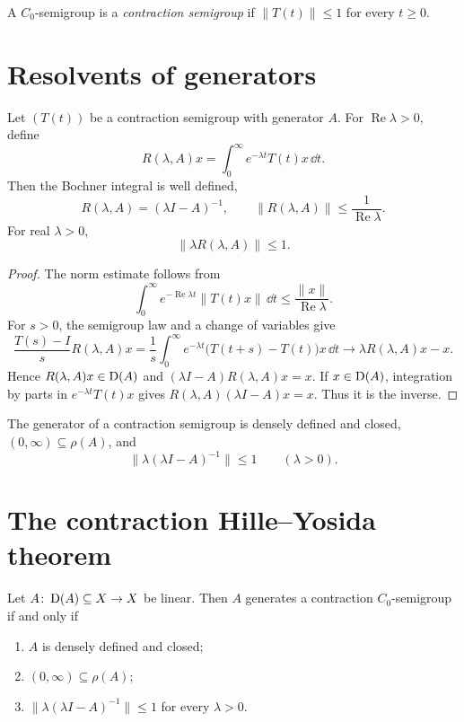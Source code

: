 \begin{notedefinition}
A $C_0$-semigroup is a \emph{contraction semigroup} if
$\|T(t)\|\le1$ for every $t\ge0$.
\end{notedefinition}

\section{Resolvents of generators}

\begin{notelemma}
Let $(T(t))$ be a contraction semigroup with generator $A$.  For
$\operatorname{Re}\lambda>0$, define
\[
  R(\lambda,A)x
  =\int_0^\infty e^{-\lambda t}T(t)x\,\dd t.
\]
Then the Bochner integral is well defined,
\[
  R(\lambda,A)=(\lambda I-A)^{-1},
  \qquad
  \|R(\lambda,A)\|\le\frac1{\operatorname{Re}\lambda}.
\]
For real $\lambda>0$,
\[
  \|\lambda R(\lambda,A)\|\le1.
\]
\end{notelemma}

\begin{proof}
The norm estimate follows from
\[
 \int_0^\infty e^{-\operatorname{Re}\lambda t}\|T(t)x\|\,\dd t
 \le\frac{\|x\|}{\operatorname{Re}\lambda}.
\]
For $s>0$, the semigroup law and a change of variables give
\[
 \frac{T(s)-I}{s}R(\lambda,A)x
 =\frac1s\int_0^\infty e^{-\lambda t}
       \bigl(T(t+s)-T(t)\bigr)x\,\dd t
 \longrightarrow \lambda R(\lambda,A)x-x.
\]
Hence $R(\lambda,A)x\in\operatorname{D}(A)$ and
$(\lambda I-A)R(\lambda,A)x=x$.  If $x\in\operatorname{D}(A)$, integration by parts in
$e^{-\lambda t}T(t)x$ gives
$R(\lambda,A)(\lambda I-A)x=x$.  Thus it is the inverse.
\end{proof}

\begin{notecorollary}
The generator of a contraction semigroup is densely defined and closed,
$(0,\infty)\subseteq\rho(A)$, and
\[
  \|\lambda(\lambda I-A)^{-1}\|\le1
  \qquad(\lambda>0).
\]
\end{notecorollary}

\section{The contraction Hille--Yosida theorem}

\begin{notetheorem}
Let $A\colon\operatorname{D}(A)\subseteq X\to X$ be linear.  Then $A$ generates a
contraction $C_0$-semigroup if and only if
\begin{enumerate}
  \item $A$ is densely defined and closed;
  \item $(0,\infty)\subseteq\rho(A)$;
  \item $\|\lambda(\lambda I-A)^{-1}\|\le1$ for every $\lambda>0$.
\end{enumerate}
\end{notetheorem}

